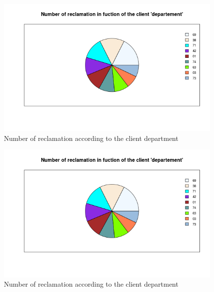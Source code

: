 \documentclass[a4paper, 11pt]{article}
\begin{document}
    \begin{figure}[!ht]
    	\centering
            \includegraphics[height = 10 cm]{Valentin/Number_of_reclamation_in_fuction_of_the_client_departement.png}
            \caption{Number of reclamation according to the client department}
            \label{fig:reclamtion_dep1}
    \end{figure}
    
    \begin{figure}[!ht]
    	\centering
            \includegraphics[height = 10 cm]{Valentin/Number_of_reclamation_in_fuction_of_the_client_departement.png}
            \caption{Number of reclamation according to the client department}
            \label{fig:reclamtion_dep2}
    \end{figure}
    
\end{document}
